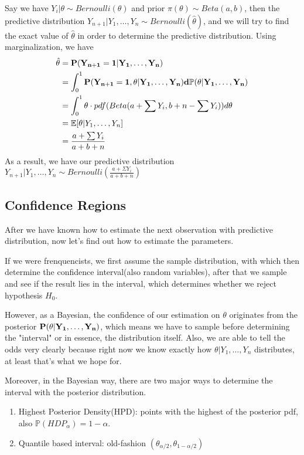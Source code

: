 \begin{example}
    Say we have $Y_i | \theta \sim Bernoulli(\theta)$ and prior $\pi(\theta) \sim Beta(a,b)$, then the predictive distribution $Y_{n+1} | Y_1, \ldots, Y_n \sim Bernoulli(\hat{\theta})$, and we will try to find the exact value of $\hat{\theta}$ in order to determine the predictive distribution. Using marginalization, we have
    \begin{align*}
        \hat{\theta} &= \bf{P}(Y_{n+1} = 1 | Y_1, \ldots, Y_n) \\
        &= \int_0^1 \bf{P}(Y_{n+1}=1, \theta | Y_1, \ldots, Y_n) d \mathbb{P}(\theta | Y_1, \ldots, Y_n) \\
        &= \int_{0}^{1} \theta \cdot pdf(Beta(a + \sum Y_i, b + n - \sum Y_i)) d\theta \\
        &= \mathbb{E}[\theta | Y_1, \ldots, Y_n] \\
        &= \frac{a + \sum Y_i}{a + b + n}
    \end{align*}
    As a result, we have our predictive distribution $Y_{n+1} | Y_1, \ldots, Y_n \sim Bernoulli(\frac{a + \Sigma Y_i}{a + b + n})$
\end{example}


\subsection{Confidence Regions}
After we have known how to estimate the next observation with predictive distribution, now let's find out how to estimate the parameters. 

If we were frenquencists, we first assume the sample distribution, with which then determine the confidence interval(also random variables), after that we sample and see if the result lies in the interval, which determines whether we reject hypothesis $H_0$.

However, as a Bayesian, the confidence of our estimation on $\theta$ originates from the posterior $\bf{P}(\theta | Y_1, \ldots, Y_n)$, which means we have to sample before determining the "interval" or in essence, the distribution itself. Also, we are able to tell the odds very clearly because right now we know exactly how $\theta | Y_1, \ldots, Y_n$ distributes, at least that's what we hope for. 

Moreover, in the Bayesian way, there are two major ways to determine the interval with the posterior distribution. 
\begin{enumerate}
    \item Highest Posterior Density(HPD): points with the highest of the posterior pdf, also $\mathbb{P}(HDP_\alpha) = 1 - \alpha$.
    \item Quantile based interval: old-fashion $(\theta_{\alpha/2}, \theta_{1-\alpha/2})$
\end{enumerate}

